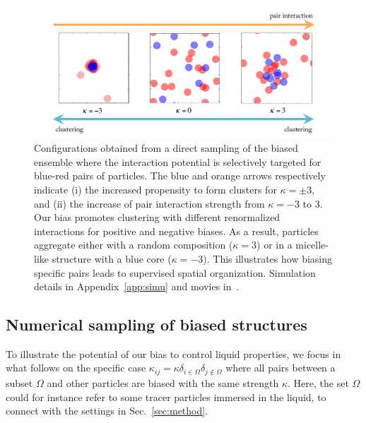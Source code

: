 \documentclass[superscriptaddress, twocolumn, prx, longbibliography, nofootinbib]{revtex4-1}
\begin{document}
\begin{figure}
	\centering
	\includegraphics[width=.9\linewidth]{fig4.pdf}
	\caption{\label{fig:outofperturbation}
	Configurations obtained from a direct sampling of the biased ensemble where the interaction potential is selectively targeted for blue-red pairs of particles. The blue and orange arrows respectively indicate (i) the increased propensity to form clusters for $\kappa=\pm3$, and (ii) the increase of pair interaction strength from $\kappa=-3$ to $3$. Our bias promotes clustering with different renormalized interactions for positive and negative biases. As a result, particles aggregate either with a random composition ($\kappa=3$) or in a micelle-like structure with a blue core ($\kappa=-3$). This illustrates how biasing specific pairs leads to supervised spatial organization.
		Simulation details in Appendix~\ref{app:simu} and movies in~\cite{movie}.
	}
\end{figure}


\subsection{{Numerical sampling of biased structures}}

To illustrate the potential of our bias to control liquid properties, we focus in what follows on the specific case $\kappa_{ij}=\kappa\delta_{i\in\Omega}\delta_{j\not\in\Omega}$ where all pairs between a subset $\Omega$ and other particles are biased with the same strength $\kappa$. Here, the set $\Omega$ could for instance refer to some tracer particles immersed in the liquid, to connect with the settings in Sec.~\ref{sec:method}. 
\end{document}
